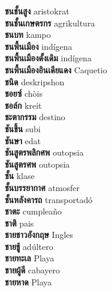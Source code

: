 \textbf{ ชนชั้นสูง  } aristokrat \\
\textbf{ ชนชั้นเกษตรกร  } agrikultura \\
\textbf{ ชนบท  } kampo \\
\textbf{ ชนพื้นเมือง  } indígena \\
\textbf{ ชนพื้นเมืองดั้งเดิม  } indígena \\
\textbf{ ชนพื้นเมืองอินเดียแดง  } Caquetio \\
\textbf{ ชนิด  } deskripshon \\
\textbf{ ชอยซ์  } chòis \\
\textbf{ ชอล์ก  } kreit \\
\textbf{ ชะตากรรม  } destino \\
\textbf{ ชันขึ้น  } subi \\
\textbf{ ชันษา  } edat \\
\textbf{ ชันสูตรพลิกศพ  } outopsia \\
\textbf{ ชันสูตรศพ  } outopsia \\
\textbf{ ชั้น  } klase \\
\textbf{ ชั้นบรรยากาศ  } atmosfer \\
\textbf{ ชั้นหลังคารถ  } transportadó \\
\textbf{ ชาตะ  } cumpleaño \\
\textbf{ ชาติ  } pais \\
\textbf{ ชายชาวอังกฤษ  } Ingles \\
\textbf{ ชายชู้  } adúltero \\
\textbf{ ชายทะเล  } Playa \\
\textbf{ ชายผู้ดี  } cabayero \\
\textbf{ ชายหาด  } Playa \\
